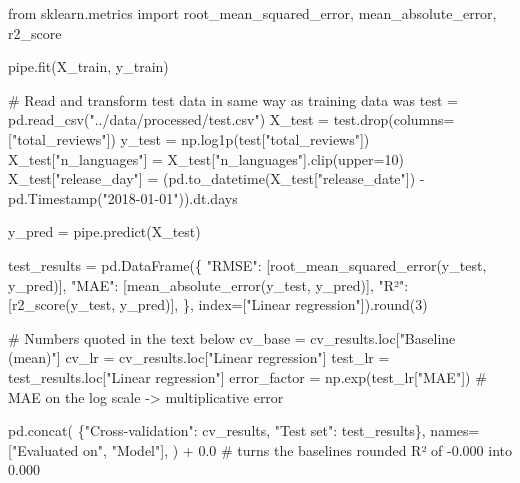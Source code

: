\documentclass[
  letterpaper,
  DIV=11,
  numbers=noendperiod]{scrartcl}
\newenvironment{Shaded}{\begin{snugshade}}{\end{snugshade}}
\newcommand{\BuiltInTok}[1]{\textcolor[rgb]{0.00,0.23,0.31}{#1}}
\newcommand{\CommentTok}[1]{\textcolor[rgb]{0.37,0.37,0.37}{#1}}
\newcommand{\DecValTok}[1]{\textcolor[rgb]{0.68,0.00,0.00}{#1}}
\newcommand{\FloatTok}[1]{\textcolor[rgb]{0.68,0.00,0.00}{#1}}
\newcommand{\ImportTok}[1]{\textcolor[rgb]{0.00,0.46,0.62}{#1}}
\newcommand{\NormalTok}[1]{\textcolor[rgb]{0.00,0.23,0.31}{#1}}
\newcommand{\OperatorTok}[1]{\textcolor[rgb]{0.37,0.37,0.37}{#1}}
\newcommand{\StringTok}[1]{\textcolor[rgb]{0.13,0.47,0.30}{#1}}
\begin{document}
\begin{Shaded}
\begin{Highlighting}[]
\ImportTok{from}\NormalTok{ sklearn.metrics }\ImportTok{import}\NormalTok{ root\_mean\_squared\_error, mean\_absolute\_error, r2\_score}

\NormalTok{pipe.fit(X\_train, y\_train)}

\CommentTok{\# Read and transform test data in same way as training data was}
\NormalTok{test }\OperatorTok{=}\NormalTok{ pd.read\_csv(}\StringTok{"../data/processed/test.csv"}\NormalTok{)}
\NormalTok{X\_test }\OperatorTok{=}\NormalTok{ test.drop(columns}\OperatorTok{=}\NormalTok{[}\StringTok{"total\_reviews"}\NormalTok{])}
\NormalTok{y\_test }\OperatorTok{=}\NormalTok{ np.log1p(test[}\StringTok{"total\_reviews"}\NormalTok{])}
\NormalTok{X\_test[}\StringTok{"n\_languages"}\NormalTok{] }\OperatorTok{=}\NormalTok{ X\_test[}\StringTok{"n\_languages"}\NormalTok{].clip(upper}\OperatorTok{=}\DecValTok{10}\NormalTok{)}
\NormalTok{X\_test[}\StringTok{"release\_day"}\NormalTok{] }\OperatorTok{=}\NormalTok{ (pd.to\_datetime(X\_test[}\StringTok{"release\_date"}\NormalTok{]) }\OperatorTok{{-}}\NormalTok{ pd.Timestamp(}\StringTok{"2018{-}01{-}01"}\NormalTok{)).dt.days}

\NormalTok{y\_pred }\OperatorTok{=}\NormalTok{ pipe.predict(X\_test)}

\NormalTok{test\_results }\OperatorTok{=}\NormalTok{ pd.DataFrame(\{}
    \StringTok{"RMSE"}\NormalTok{: [root\_mean\_squared\_error(y\_test, y\_pred)],}
    \StringTok{"MAE"}\NormalTok{: [mean\_absolute\_error(y\_test, y\_pred)],}
    \StringTok{"R²"}\NormalTok{: [r2\_score(y\_test, y\_pred)],}
\NormalTok{\}, index}\OperatorTok{=}\NormalTok{[}\StringTok{"Linear regression"}\NormalTok{]).}\BuiltInTok{round}\NormalTok{(}\DecValTok{3}\NormalTok{)}

\CommentTok{\# Numbers quoted in the text below}
\NormalTok{cv\_base }\OperatorTok{=}\NormalTok{ cv\_results.loc[}\StringTok{"Baseline (mean)"}\NormalTok{]}
\NormalTok{cv\_lr }\OperatorTok{=}\NormalTok{ cv\_results.loc[}\StringTok{"Linear regression"}\NormalTok{]}
\NormalTok{test\_lr }\OperatorTok{=}\NormalTok{ test\_results.loc[}\StringTok{"Linear regression"}\NormalTok{]}
\NormalTok{error\_factor }\OperatorTok{=}\NormalTok{ np.exp(test\_lr[}\StringTok{"MAE"}\NormalTok{])  }\CommentTok{\# MAE on the log scale {-}\textgreater{} multiplicative error}
\end{Highlighting}
\end{Shaded}

\begin{Shaded}
\begin{Highlighting}[]
\NormalTok{pd.concat(}
\NormalTok{    \{}\StringTok{"Cross{-}validation"}\NormalTok{: cv\_results, }\StringTok{"Test set"}\NormalTok{: test\_results\},}
\NormalTok{    names}\OperatorTok{=}\NormalTok{[}\StringTok{"Evaluated on"}\NormalTok{, }\StringTok{"Model"}\NormalTok{],}
\NormalTok{) }\OperatorTok{+} \FloatTok{0.0}  \CommentTok{\# turns the baseline\textquotesingle{}s rounded R² of {-}0.000 into 0.000}
\end{Highlighting}
\end{Shaded}
\end{document}

